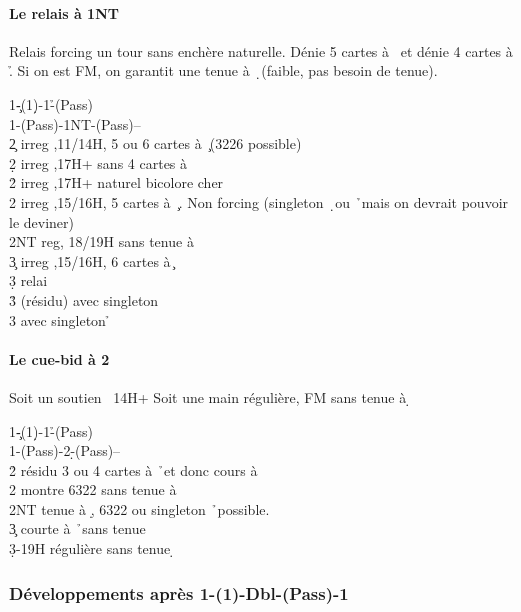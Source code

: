 \documentclass[a4paper]{article}
\begin{document}
\paragraph{Le relais à 1NT}

Relais forcing un tour sans enchère naturelle. Dénie 5 cartes à \s\ et dénie 4 cartes à \h . 
Si on est FM, on garantit une tenue à \d\ (faible, pas besoin de tenue).

\begin{bidtable}
1\c-(1\d)-1\h-(Pass)\\
1\s-(Pass)-1NT-(Pass)--\\
2\c \> irreg ,11/14H, 5 ou 6 cartes à \c\ (3226 possible)\\
2\d \> irreg ,17H+ sans 4 cartes à \h \\
2\h \> irreg ,17H+ naturel bicolore cher\\
2\s \> irreg ,15/16H, 5 cartes à \c\ . Non forcing (singleton \d\ ou \h\ mais on devrait pouvoir le deviner)\\
2NT \> reg, 18/19H sans tenue à \d \\
3\c \> irreg ,15/16H, 6 cartes à \c \+\\
3\d \> relai\+\\
3\h \> (résidu) avec singleton \d \\
3\s \> avec singleton \h \-\-
\end{bidtable}

\paragraph{Le cue-bid à 2 \pdfd}

Soit un soutien \s\ 14H+
Soit une main régulière, FM sans tenue à \d 

\begin{bidtable}
1\c-(1\d)-1\h-(Pass)\\
1\s-(Pass)-2\d-(Pass)--\\
2\h \> résidu 3 ou 4 cartes à \h\ et donc cours à \d \\
2\s \> montre 6322 sans tenue à \d \\
2NT \> tenue à \d , 6322 ou singleton \h\ possible.\\
3\c \> courte à \h\ sans tenue \d \\
3\d {}-19H régulière sans tenue \d 
\end{bidtable}

\subsubsection{Développements après 1\pdfc-(1\pdfh)-Dbl-(Pass)-1\pdfs}
\end{document}
